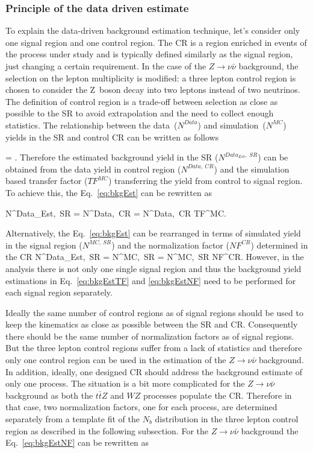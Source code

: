 \subsubsection{Principle of the data driven estimate}

To explain the data-driven background estimation technique, let's consider only one signal region and one control region. The CR is a region enriched in events of the process under study and is typically defined similarly as the signal region, just changing a certain requirement. In the case of the $Z \to \nu \bar{\nu}$ background, the selection on the lepton multiplicity is modified: a three lepton control region is chosen to consider the Z~boson decay into two leptons instead of two neutrinos. The definition of control region is a trade-off between selection as close as possible to the SR to avoid extrapolation and the need to collect enough statistics. The relationship between the data~($N^{Data}$) and simulation~($N^{MC}$) yields in the SR and control CR can be written as follows

{
  = .
}
Therefore the estimated background yield in the SR ($N^{Data_{Est},~SR}$) can be obtained from the data yield in control region ($N^{Data,~CR}$) and the simulation based transfer factor ($TF^{MC}$) transferring the yield from control to signal region. To achieve this, the Eq.~\ref{eq:bkgEst} can be rewritten as

{
N^{Data_{Est},~SR}  = N^{Data,~CR} \times  {} = N^{Data,~CR} \times  TF^{MC}.
}

Alternatively, the Eq.~\ref{eq:bkgEst} can be rearranged in terms of simulated yield in the signal region ($N^{MC,~SR}$) and the normalization factor ($NF^{CR}$) determined in the CR
{
N^{Data_{Est},~SR}  = N^{MC,~SR} \times  {} = N^{MC,~SR} \times  NF^{CR}.
}
However, in the analysis there is not only one single signal region and thus the background yield estimations in Eq.~\ref{eq:bkgEstTF} and \ref{eq:bkgEstNF} need to be performed for each signal region separately. 

Ideally the same number of control regions as of signal regions should be used to keep the kinematics as close as possible between the SR and CR. Consequently there should be the same number of normalization factors as of signal regions.  But the three lepton control regions suffer from a lack of statistics and therefore  only one control region can be used in the estimation of the $Z \to \nu \bar{\nu}$ background. In addition, ideally, one designed  CR should address the background estimate of only one process. The situation is a bit more complicated for the $Z \to \nu \bar{\nu}$ background as both the  $t\bar{t}Z$ and $WZ$ processes populate the CR.  Therefore in that case, two normalization factors, one for each process, are determined separately  from a template fit of the $N_{b}$ distribution in the three lepton control region as described in the following subsection. For the $Z \to \nu \bar{\nu}$ background the Eq.~\ref{eq:bkgEstNF} can be rewritten as

